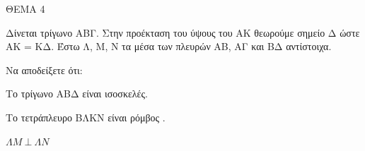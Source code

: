 
ΘΕΜΑ 4

Δίνεται τρίγωνο ΑΒΓ. Στην προέκταση του ύψους του ΑΚ θεωρούμε σημείο Δ ώστε ΑΚ = ΚΔ. Έστω Λ, Μ, Ν τα μέσα των πλευρών ΑΒ, ΑΓ και ΒΔ αντίστοιχα.

Να αποδείξετε ότι:

\begin{alist}
\item Το τρίγωνο ΑΒΔ είναι ισοσκελές. 

\item Το τετράπλευρο ΒΛΚΝ είναι ρόμβος . 

\item $\Lambda Μ\ \bot\ \Lambda Ν$ 


\end{alist}

